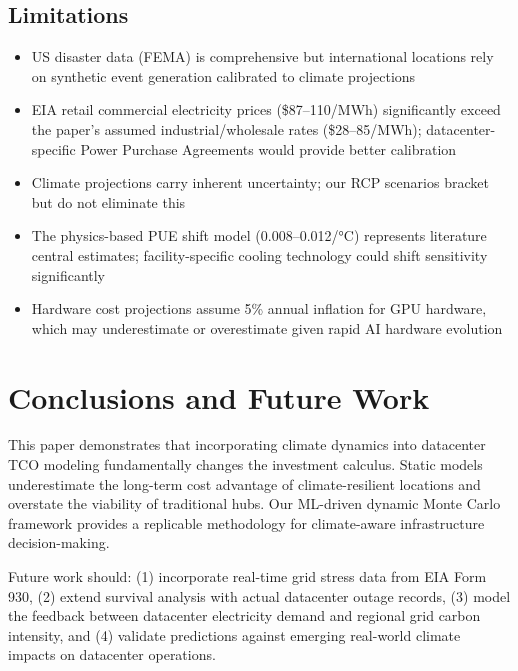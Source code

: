 \documentclass[12pt,a4paper]{article}
\begin{document}
\subsection{Limitations}

\begin{itemize}
    \item US disaster data (FEMA) is comprehensive but international locations rely on synthetic event generation calibrated to climate projections
    \item EIA retail commercial electricity prices (\$87--110/MWh) significantly exceed the paper's assumed industrial/wholesale rates (\$28--85/MWh); datacenter-specific Power Purchase Agreements would provide better calibration
    \item Climate projections carry inherent uncertainty; our RCP scenarios bracket but do not eliminate this
    \item The physics-based PUE shift model (0.008--0.012/°C) represents literature central estimates; facility-specific cooling technology could shift sensitivity significantly
    \item Hardware cost projections assume 5\% annual inflation for GPU hardware, which may underestimate or overestimate given rapid AI hardware evolution
\end{itemize}

\section{Conclusions and Future Work}
\label{sec:conclusions}

This paper demonstrates that incorporating climate dynamics into datacenter TCO modeling fundamentally changes the investment calculus. Static models underestimate the long-term cost advantage of climate-resilient locations and overstate the viability of traditional hubs. Our ML-driven dynamic Monte Carlo framework provides a replicable methodology for climate-aware infrastructure decision-making.

Future work should: (1) incorporate real-time grid stress data from EIA Form 930, (2) extend survival analysis with actual datacenter outage records, (3) model the feedback between datacenter electricity demand and regional grid carbon intensity, and (4) validate predictions against emerging real-world climate impacts on datacenter operations.
\end{document}
